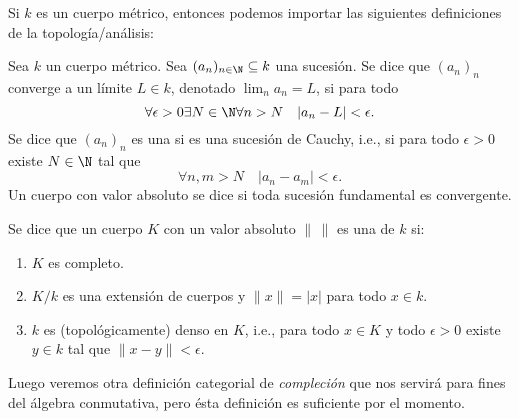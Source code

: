 \documentclass[teoria-numeros.tex]{subfiles}
\begin{document}
Si $k$ es un cuerpo métrico, entonces podemos importar las siguientes definiciones de la topología/análisis:
\begin{mydef}
	Sea $k$ un cuerpo métrico.
	Sea $(a_n)_{n \in \N} \subseteq k$ una sucesión.
	Se dice que $(a_n)_n$ converge a un límite $L \in k$, denotado $\lim_n a_n = L$, si para todo
	$$ \forall \epsilon > 0 \exists N \in \N \forall n > N \quad |a_n - L| < \epsilon. $$
	Se dice que $(a_n)_n$ es una  si es una sucesión de Cauchy, i.e., si para todo $\epsilon > 0$
	existe $N \in \N$ tal que
	$$ \forall n, m > N \quad |a_n - a_m| < \epsilon. $$
	Un cuerpo con valor absoluto se dice  si toda sucesión fundamental es convergente.

	Se dice que un cuerpo $K$ con un valor absoluto $\| \, \|$ es una  de $k$ si:
	\begin{enumerate}
		\item $K$ es completo.
		\item $K/k$ es una extensión de cuerpos y $\|x\| = |x|$ para todo $x \in k$.
		\item $k$ es (topológicamente) denso en $K$, i.e., para todo $x \in K$ y todo $\epsilon > 0$ existe $y \in k$ tal que $\|x - y\| < \epsilon$.
	\end{enumerate}
\end{mydef}
Luego veremos otra definición categorial de \textit{compleción} que nos servirá para fines del álgebra conmutativa,
pero ésta definición es suficiente por el momento.
\end{document}

